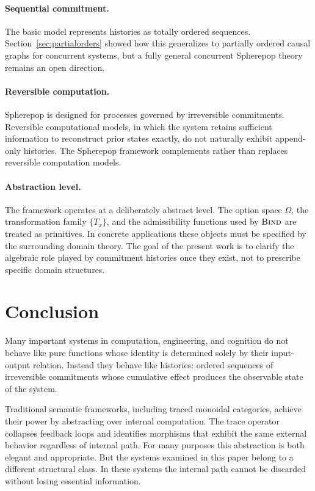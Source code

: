 \documentclass[12pt]{article}
\newcommand{\Bind}{\operatorname{\textsc{Bind}}}
\newcommand{\Option}{\Omega}
\begin{document}
\paragraph{Sequential commitment.} The basic model represents histories as totally ordered sequences. Section~\ref{sec:partialorders} showed how this generalizes to partially ordered causal graphs for concurrent systems, but a fully general concurrent Spherepop theory remains an open direction.

\paragraph{Reversible computation.} Spherepop is designed for processes governed by irreversible commitments. Reversible computational models, in which the system retains sufficient information to reconstruct prior states exactly, do not naturally exhibit append-only histories. The Spherepop framework complements rather than replaces reversible computation models.

\paragraph{Abstraction level.} The framework operates at a deliberately abstract level. The option space $\Option$, the transformation family $\{T_x\}$, and the admissibility functions used by $\Bind$ are treated as primitives. In concrete applications these objects must be specified by the surrounding domain theory. The goal of the present work is to clarify the algebraic role played by commitment histories once they exist, not to prescribe specific domain structures.

\section{Conclusion}
\label{sec:conclusion}

Many important systems in computation, engineering, and cognition do not behave like pure functions whose identity is determined solely by their input-output relation. Instead they behave like histories: ordered sequences of irreversible commitments whose cumulative effect produces the observable state of the system.

Traditional semantic frameworks, including traced monoidal categories, achieve their power by abstracting over internal computation. The trace operator collapses feedback loops and identifies morphisms that exhibit the same external behavior regardless of internal path. For many purposes this abstraction is both elegant and appropriate. But the systems examined in this paper belong to a different structural class. In these systems the internal path cannot be discarded without losing essential information.
\end{document}
